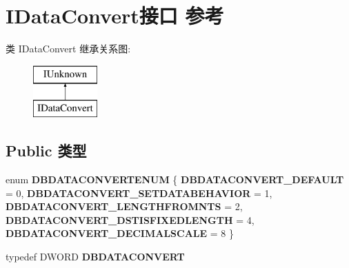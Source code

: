 \hypertarget{interface_i_data_convert}{}\section{I\+Data\+Convert接口 参考}
\label{interface_i_data_convert}
类 I\+Data\+Convert 继承关系图\+:\begin{figure}[H]
\begin{center}
\leavevmode
\includegraphics[height=2.000000cm]{interface_i_data_convert}
\end{center}
\end{figure}
\subsection*{Public 类型}
\begin{DoxyCompactItemize}
\item 
\mbox{\label{interface_i_data_convert_a675e917deeae78dcba81690131ee9745}} 
enum {\bfseries D\+B\+D\+A\+T\+A\+C\+O\+N\+V\+E\+R\+T\+E\+N\+UM} \{ \newline
{\bfseries D\+B\+D\+A\+T\+A\+C\+O\+N\+V\+E\+R\+T\+\_\+\+D\+E\+F\+A\+U\+LT} = 0, 
{\bfseries D\+B\+D\+A\+T\+A\+C\+O\+N\+V\+E\+R\+T\+\_\+\+S\+E\+T\+D\+A\+T\+A\+B\+E\+H\+A\+V\+I\+OR} = 1, 
{\bfseries D\+B\+D\+A\+T\+A\+C\+O\+N\+V\+E\+R\+T\+\_\+\+L\+E\+N\+G\+T\+H\+F\+R\+O\+M\+N\+TS} = 2, 
{\bfseries D\+B\+D\+A\+T\+A\+C\+O\+N\+V\+E\+R\+T\+\_\+\+D\+S\+T\+I\+S\+F\+I\+X\+E\+D\+L\+E\+N\+G\+TH} = 4, 
\newline
{\bfseries D\+B\+D\+A\+T\+A\+C\+O\+N\+V\+E\+R\+T\+\_\+\+D\+E\+C\+I\+M\+A\+L\+S\+C\+A\+LE} = 8
 \}
\item 
\mbox{\label{interface_i_data_convert_a3ce8d1f2cdf1e9f3012b862ddff889b0}} 
typedef D\+W\+O\+RD {\bfseries D\+B\+D\+A\+T\+A\+C\+O\+N\+V\+E\+RT}
\end{DoxyCompactItemize}
